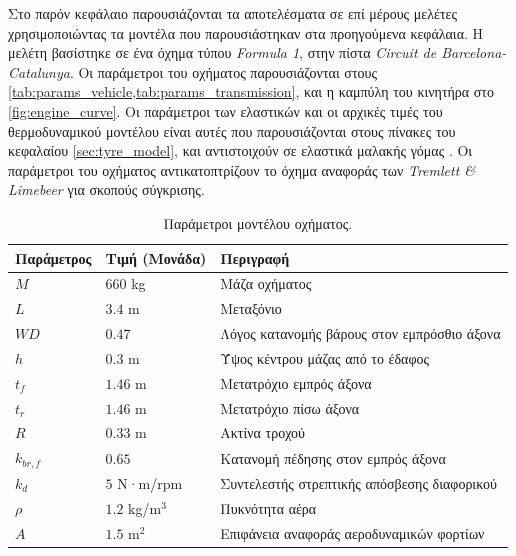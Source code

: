 Στο παρόν κεφάλαιο παρουσιάζονται τα αποτελέσματα σε επί μέρους μελέτες χρησιμοποιώντας τα μοντέλα που παρουσιάστηκαν στα προηγούμενα κεφάλαια. Η μελέτη βασίστηκε σε ένα όχημα τύπου \textit{Formula 1}, στην πίστα \textit{Circuit
de Barcelona-Catalunya}. Οι παράμετροι του οχήματος παρουσιάζονται στους \cref{tab:params_vehicle,tab:params_transmission}, και η καμπύλη του κινητήρα στο \cref{fig:engine_curve}. Οι παράμετροι των ελαστικών και οι αρχικές τιμές του θερμοδυναμικού μοντέλου είναι αυτές που παρουσιάζονται στους πίνακες του κεφαλαίου \ref{sec:tyre_model}, και αντιστοιχούν σε ελαστικά μαλακής γόμας \cite{Tremlett2016}. Οι παράμετροι του οχήματος αντικατοπτρίζουν το όχημα αναφοράς των \textit{Tremlett \& Limebeer} \cite{Tremlett2016} για σκοπούς σύγκρισης.

\begin{table}[htbp]
    \centering
    \small
    \renewcommand{\arraystretch}{1.2}
    \begin{tabular}{@{}l l l@{}}
        \toprule
        \textbf{Παράμετρος} & \textbf{Τιμή (Μονάδα)} & \textbf{Περιγραφή} \\
        \midrule
        $M$          & $660$ kg               & Μάζα οχήματος \\
        $L$          & $3.4$ m                & Μεταξόνιο \\
        $WD$         & $0.47$                 & Λόγος κατανομής βάρους στον εμπρόσθιο άξονα \\
        $h$          & $0.3$ m                & Ύψος κέντρου μάζας από το έδαφος \\
        $t_f$        & $1.46$ m               & Μετατρόχιο εμπρός άξονα \\
        $t_r$        & $1.46$ m               & Μετατρόχιο πίσω άξονα \\
        $R$          & $0.33$ m               & Ακτίνα τροχού \\
        $k_{br,f}$   & $0.65$                 & Κατανομή πέδησης στον εμπρός άξονα \\
        $k_d$        & $5$ N·m/rpm & Συντελεστής στρεπτικής απόσβεσης διαφορικού \\
        $\rho$       & $1.2$ kg/m$^3$         & Πυκνότητα αέρα \\
        $A$          & $1.5$ m$^2$            & Επιφάνεια αναφοράς αεροδυναμικών φορτίων \\
        \bottomrule
    \end{tabular}
    \caption{Παράμετροι μοντέλου οχήματος.}
    \label{tab:params_vehicle}
\end{table}



